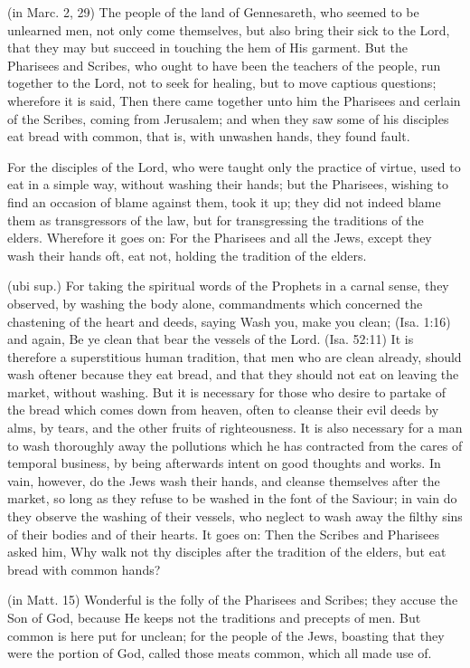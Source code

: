  (in Marc. 2, 29) The people of the land of Gennesareth, who seemed to be unlearned men, not only come themselves, but also bring their sick to the Lord, that they may but succeed in touching the hem of His garment. But the Pharisees and Scribes, who ought to have been the teachers of the people, run together to the Lord, not to seek for healing, but to move captious questions; wherefore it is said, Then there came together unto him the Pharisees and cerlain of the Scribes, coming from Jerusalem; and when they saw some of his disciples eat bread with common, that is, with unwashen hands, they found fault.

 For the disciples of the Lord, who were taught only the practice of virtue, used to eat in a simple way, without washing their hands; but the Pharisees, wishing to find an occasion of blame against them, took it up; they did not indeed blame them as transgressors of the law, but for transgressing the traditions of the elders. Wherefore it goes on: For the Pharisees and all the Jews, except they wash their hands oft, eat not, holding the tradition of the elders.

 (ubi sup.) For taking the spiritual words of the Prophets in a carnal sense, they observed, by washing the body alone, commandments which concerned the chastening of the heart and deeds, saying Wash you, make you clean; (Isa. 1:16) and again, Be ye clean that bear the vessels of the Lord. (Isa. 52:11) It is therefore a superstitious human tradition, that men who are clean already, should wash oftener because they eat bread, and that they should not eat on leaving the market, without washing. But it is necessary for those who desire to partake of the bread which comes down from heaven, often to cleanse their evil deeds by alms, by tears, and the other fruits of righteousness. It is also necessary for a man to wash thoroughly away the pollutions which he has contracted from the cares of temporal business, by being afterwards intent on good thoughts and works. In vain, however, do the Jews wash their hands, and cleanse themselves after the market, so long as they refuse to be washed in the font of the Saviour; in vain do they observe the washing of their vessels, who neglect to wash away the filthy sins of their bodies and of their hearts. It goes on: Then the Scribes and Pharisees asked him, Why walk not thy disciples after the tradition of the elders, but eat bread with common hands?

 (in Matt. 15) Wonderful is the folly of the Pharisees and Scribes; they accuse the Son of God, because He keeps not the traditions and precepts of men. But common is here put for unclean; for the people of the Jews, boasting that they were the portion of God, called those meats common, which all made use of.

